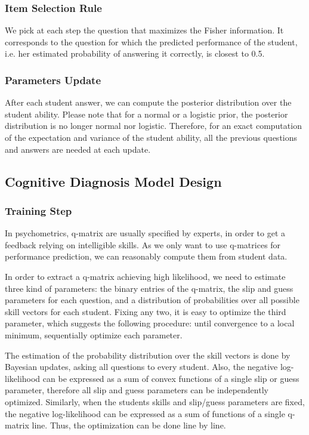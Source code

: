 \documentclass{sig-alternate}
\begin{document}
\subsubsection{Item Selection Rule}

We pick at each step the question that maximizes the Fisher information. It corresponds to the question for which the predicted performance of the student, i.e. her estimated probability of answering it correctly, is closest to 0.5. %

\subsubsection{Parameters Update}

After each student answer, we can compute the posterior distribution over the student ability. Please note that for a normal or a logistic prior, the posterior distribution is no longer normal nor logistic. Therefore, for an exact computation of the expectation and variance of the student ability, all the previous questions and answers are needed at each update.

\subsection{Cognitive Diagnosis Model Design}

\subsubsection{Training Step}

In psychometrics, q-matrix are usually specified by experts, in order to get a feedback relying on intelligible skills. As we only want to use q-matrices for performance prediction, we can reasonably compute them from student data.

In order to extract a q-matrix achieving high likelihood, we need to estimate three kind of parameters: the binary entries of the q-matrix, the slip and guess parameters for each question, and a distribution of probabilities over all possible skill vectors for each student. Fixing any two, it is easy to optimize the third parameter, which suggests the following procedure: until convergence to a local minimum, sequentially optimize each parameter.

The estimation of the probability distribution over the skill vectors is done by Bayesian updates, asking all questions to every student. Also, the negative log-likelihood can be expressed as a sum of convex functions of a single slip or guess parameter, therefore all slip and guess parameters can be independently optimized.  Similarly, when the students skills and slip/guess parameters are fixed, the negative log-likelihood can be expressed as a sum of functions of a single q-matrix line. Thus, the optimization can be done line by line. %
\end{document}
